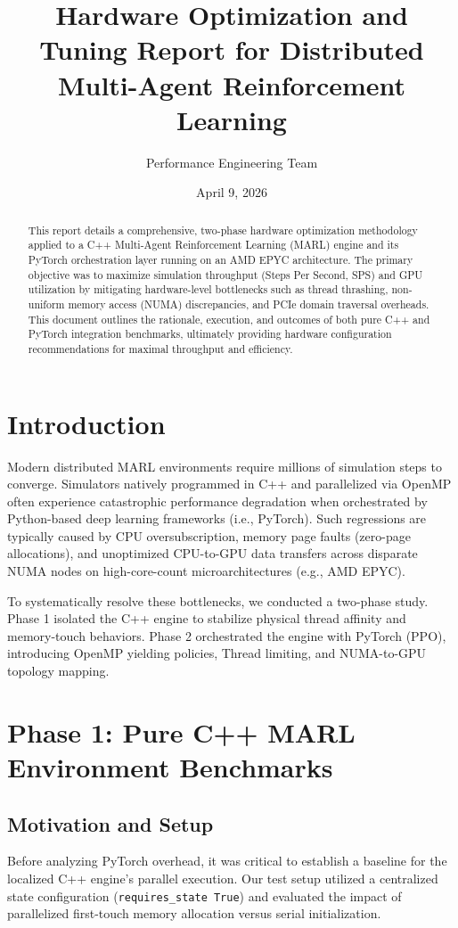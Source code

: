 \documentclass[11pt,a4paper]{article}
\title{Hardware Optimization and Tuning Report for Distributed Multi-Agent Reinforcement Learning}
\author{Performance Engineering Team}
\date{April 9, 2026}
\begin{document}
\maketitle

\begin{abstract}
This report details a comprehensive, two-phase hardware optimization methodology applied to a C++ Multi-Agent Reinforcement Learning (MARL) engine and its PyTorch orchestration layer running on an AMD EPYC architecture. The primary objective was to maximize simulation throughput (Steps Per Second, SPS) and GPU utilization by mitigating hardware-level bottlenecks such as thread thrashing, non-uniform memory access (NUMA) discrepancies, and PCIe domain traversal overheads. This document outlines the rationale, execution, and outcomes of both pure C++ and PyTorch integration benchmarks, ultimately providing hardware configuration recommendations for maximal throughput and efficiency.
\end{abstract}

\section{Introduction}
Modern distributed MARL environments require millions of simulation steps to converge. Simulators natively programmed in C++ and parallelized via OpenMP often experience catastrophic performance degradation when orchestrated by Python-based deep learning frameworks (i.e., PyTorch). Such regressions are typically caused by CPU oversubscription, memory page faults (zero-page allocations), and unoptimized CPU-to-GPU data transfers across disparate NUMA nodes on high-core-count microarchitectures (e.g., AMD EPYC).

To systematically resolve these bottlenecks, we conducted a two-phase study. Phase 1 isolated the C++ engine to stabilize physical thread affinity and memory-touch behaviors. Phase 2 orchestrated the engine with PyTorch (PPO), introducing OpenMP yielding policies, Thread limiting, and NUMA-to-GPU topology mapping.

\section{Phase 1: Pure C++ MARL Environment Benchmarks}
\subsection{Motivation and Setup}
Before analyzing PyTorch overhead, it was critical to establish a baseline for the localized C++ engine's parallel execution. Our test setup utilized a centralized state configuration (\texttt{requires\_state True}) and evaluated the impact of parallelized first-touch memory allocation versus serial initialization. 
\end{document}
